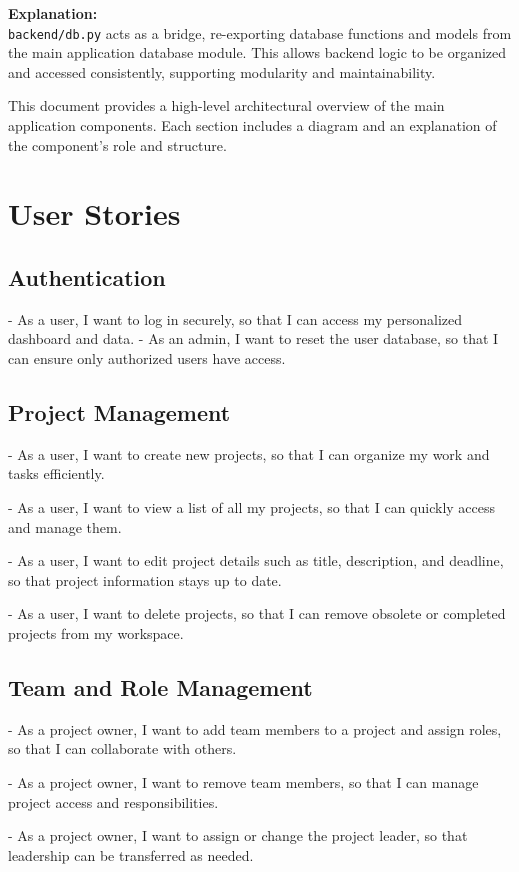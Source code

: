 \documentclass{report}
\begin{document}
\noindent
\textbf{Explanation:} \\
\texttt{backend/db.py} acts as a bridge, re-exporting database functions and models from the main application database module. This allows backend logic to be organized and accessed consistently, supporting modularity and maintainability.



This document provides a high-level architectural overview of the main application components. Each section includes a diagram and an explanation of the component's role and structure.
\chapter{User Stories}
\section{Authentication}

- As a user, I want to log in securely, so that I can access my personalized dashboard and data.
- As an admin, I want to reset the user database, so that I can ensure only authorized users have access.

\section{Project Management}
- As a user, I want to create new projects, so that I can organize my work and tasks efficiently.

- As a user, I want to view a list of all my projects, so that I can quickly access and manage them.

- As a user, I want to edit project details such as title, description, and deadline, so that project information stays up to date.

- As a user, I want to delete projects, so that I can remove obsolete or completed projects from my workspace.

\section{Team and Role Management}
- As a project owner, I want to add team members to a project and assign roles, so that I can collaborate with others.

- As a project owner, I want to remove team members, so that I can manage project access and responsibilities.

- As a project owner, I want to assign or change the project leader, so that leadership can be transferred as needed.
\end{document}

